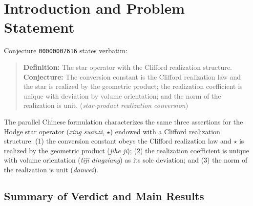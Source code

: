 \documentclass[11pt]{article}
\theoremstyle{definition}
\begin{document}
\section{Introduction and Problem Statement}

Conjecture \texttt{00000007616} states verbatim:
\begin{quote}
\textbf{Definition:} The star operator with the Clifford realization structure. \textbf{Conjecture:} The conversion constant is the Clifford realization law and the star is realized by the geometric product; the realization coefficient is unique with deviation by volume orientation; and the norm of the realization is unit. (\emph{star-product realization conversion})
\end{quote}
The parallel Chinese formulation characterizes the same three assertions for the Hodge star operator (\emph{xing suanzi}, $\star$) endowed with a Clifford realization structure: (1) the conversion constant obeys the Clifford realization law and $\star$ is realized by the geometric product (\emph{jihe ji}); (2) the realization coefficient is unique with volume orientation (\emph{tiji dingxiang}) as its sole deviation; and (3) the norm of the realization is unit (\emph{danwei}).

\subsection*{Summary of Verdict and Main Results}
\end{document}
